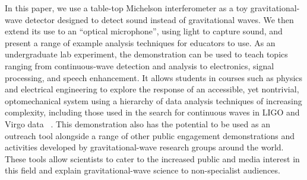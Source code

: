 \documentclass[paper-main.tex]{subfiles}
\begin{document}
In this paper, we use a table-top Michelson interferometer as a toy gravitational-wave detector designed to detect sound instead of gravitational waves. 
We then extend its use to an ``optical microphone'', using light to capture sound, and present a range of example analysis techniques for educators to use. 
As an undergraduate lab experiment, the demonstration can be used to teach topics ranging from continuous-wave detection and analysis to electronics, signal processing, and speech enhancement.
It allows students in courses such as physics and electrical engineering to explore the response of an accessible, yet nontrivial, optomechanical system using a hierarchy of data analysis techniques of increasing complexity, including those used in the search for continuous waves in LIGO and Virgo data~
\cite{SuvorovaEtAl:2017, ScoX1O2Viterbi:2019}. 
This demonstration also has the potential to be used as an outreach tool alongside a range of other public engagement demonstrations and activities developed by gravitational-wave research groups around the world. 
These tools allow scientists to cater to the increased public and media interest in this field and explain gravitational-wave science to non-specialist audiences.
\end{document}
